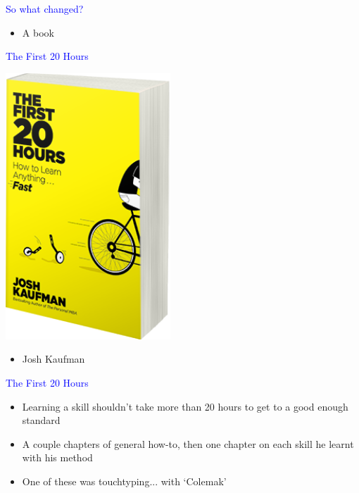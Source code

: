 \documentclass[landscape]{slides}
\begin{document}
\begin{slide}

    \textcolor{blue}{\Large{So what changed?}}

    \begin{itemize}
        \item A book
    \end{itemize}

\end{slide}


\begin{slide}

    \textcolor{blue}{\Large{The First 20 Hours}}

    \includegraphics[height=10cm]{first20hours-cover}

    \begin{itemize}
        \item Josh Kaufman
    \end{itemize}

\end{slide}


\begin{slide}

    \textcolor{blue}{\Large{The First 20 Hours}}

    \begin{itemize}
        \item Learning a skill shouldn't take more than 20 hours to get to a good enough standard
        \item A couple chapters of general how-to, then one chapter on each skill he learnt with his method
        \item One of these was touchtyping... with `Colemak'
    \end{itemize}

\end{slide}
\end{document}

